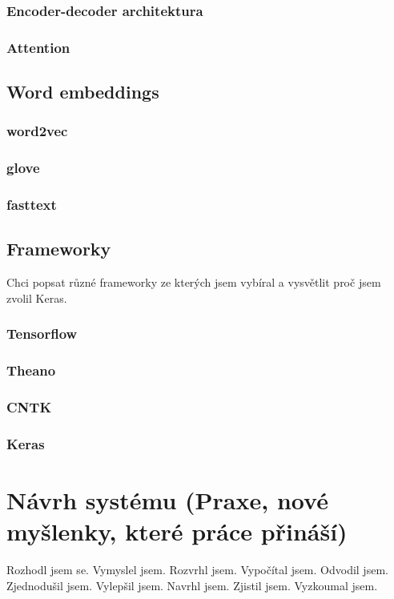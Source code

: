 \subsection{Encoder-decoder architektura}
\subsection{Attention}

\section{Word embeddings}
\subsection{word2vec}
\subsection{glove}
\subsection{fasttext}

\section{Frameworky}
Chci popsat různé frameworky ze kterých jsem vybíral a vysvětlit proč jsem zvolil Keras.
\subsection{Tensorflow}
\subsection{Theano}
\subsection{CNTK}
\subsection{Keras}

\chapter{Návrh systému (Praxe, nové myšlenky, které práce přináší)}
Rozhodl jsem se.
Vymyslel jsem.
Rozvrhl jsem.
Vypočítal jsem.
Odvodil jsem.
Zjednodušil jsem.
Vylepšil jsem.
Navrhl jsem.
Zjistil jsem.
Vyzkoumal jsem.

